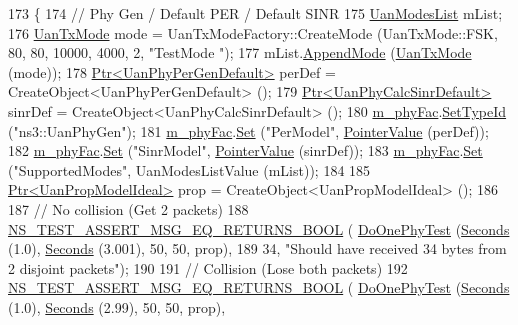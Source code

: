 \begin{DoxyCode}
173 \{
174   \textcolor{comment}{// Phy Gen / Default PER / Default SINR}
175   \hyperlink{classns3_1_1UanModesList}{UanModesList} mList;
176   \hyperlink{classns3_1_1UanTxMode}{UanTxMode} mode = UanTxModeFactory::CreateMode (UanTxMode::FSK, 80, 80, 10000, 4000, 2, \textcolor{stringliteral}{"TestMode
      "});
177   mList.\hyperlink{classns3_1_1UanModesList_ae47998ab8ad053aecd5f2849043ec403}{AppendMode} (\hyperlink{classns3_1_1UanTxMode}{UanTxMode} (mode));
178   \hyperlink{classns3_1_1Ptr}{Ptr<UanPhyPerGenDefault>} perDef = CreateObject<UanPhyPerGenDefault> ();
179   \hyperlink{classns3_1_1Ptr}{Ptr<UanPhyCalcSinrDefault>} sinrDef = CreateObject<UanPhyCalcSinrDefault> ();
180   \hyperlink{classUanTest_aa3af462909130b54c4b43b5bca42446b}{m\_phyFac}.\hyperlink{classns3_1_1ObjectFactory_a77dcd099064038a1eb7a6b8251229ec3}{SetTypeId} (\textcolor{stringliteral}{"ns3::UanPhyGen"});
181   \hyperlink{classUanTest_aa3af462909130b54c4b43b5bca42446b}{m\_phyFac}.\hyperlink{classns3_1_1ObjectFactory_aef5c0d5019c96bdf01cefd1ff83f4a68}{Set} (\textcolor{stringliteral}{"PerModel"}, \hyperlink{classns3_1_1PointerValue}{PointerValue} (perDef));
182   \hyperlink{classUanTest_aa3af462909130b54c4b43b5bca42446b}{m\_phyFac}.\hyperlink{classns3_1_1ObjectFactory_aef5c0d5019c96bdf01cefd1ff83f4a68}{Set} (\textcolor{stringliteral}{"SinrModel"}, \hyperlink{classns3_1_1PointerValue}{PointerValue} (sinrDef));
183   \hyperlink{classUanTest_aa3af462909130b54c4b43b5bca42446b}{m\_phyFac}.\hyperlink{classns3_1_1ObjectFactory_aef5c0d5019c96bdf01cefd1ff83f4a68}{Set} (\textcolor{stringliteral}{"SupportedModes"}, UanModesListValue (mList));
184 
185   \hyperlink{classns3_1_1Ptr}{Ptr<UanPropModelIdeal>} prop = CreateObject<UanPropModelIdeal> ();
186 
187   \textcolor{comment}{// No collision (Get 2 packets)}
188   \hyperlink{group__testing_ga5649dddde97a42ddfd4cd88aa53b37c6}{NS\_TEST\_ASSERT\_MSG\_EQ\_RETURNS\_BOOL} (
      \hyperlink{classUanTest_a006331b086a052683abed216dc67dd8d}{DoOnePhyTest} (\hyperlink{group__timecivil_ga33c34b816f8ff6628e33d5c8e9713b9e}{Seconds} (1.0), \hyperlink{group__timecivil_ga33c34b816f8ff6628e33d5c8e9713b9e}{Seconds} (3.001), 50, 50, prop),
189                                       34, \textcolor{stringliteral}{"Should have received 34 bytes from 2 disjoint packets"});
190 
191   \textcolor{comment}{// Collision (Lose both packets)}
192   \hyperlink{group__testing_ga5649dddde97a42ddfd4cd88aa53b37c6}{NS\_TEST\_ASSERT\_MSG\_EQ\_RETURNS\_BOOL} (
      \hyperlink{classUanTest_a006331b086a052683abed216dc67dd8d}{DoOnePhyTest} (\hyperlink{group__timecivil_ga33c34b816f8ff6628e33d5c8e9713b9e}{Seconds} (1.0), \hyperlink{group__timecivil_ga33c34b816f8ff6628e33d5c8e9713b9e}{Seconds} (2.99), 50, 50, prop),

\end{DoxyCode}
